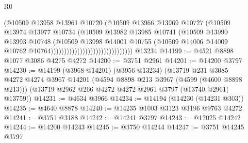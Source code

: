 \begin{lexlean}{R0}
\begin{coremodule}
                                                    (@10509
                                                      @13958
                                                      @13961
                                                      @10720
                                                      (@10509
                                                        @13966
                                                        @13969
                                                        @10727
                                                        (@10509
                                                          @13974
                                                          @13977
                                                          @10734
                                                          (@10509
                                                            @13982
                                                            @13985
                                                            @10741
                                                            (@10509
                                                              @13990
                                                              @13993
                                                              @10748
                                                              (@10509
                                                                @13998
                                                                @14001
                                                                @10755
                                                                (@10509
                                                                  @14006
                                                                  @14009
                                                                  @10762
                                                                  @10764)))))))))))))))))))))))))))))))
    @13234
@14199 := @4521 @8898 @1077 @3086 @4275 @4272
@14200 := @3751 @2961
@14201 := @14200 @3797
@14230 := @14199
    (@3968 @14201)
    (@3956 @13234)
    (@13719
      @231
      @3085
      @4272
      @4274
      @3967
      @14201
      (@4594 @8898 @213 @3967 (@4599 (@4600 @8898 @213)))
      (@13719 @2962 @266 @4272 @4272 @2961 @3797 (@13740 @2961) @13759))
@14231 := @4634 @3966
@14234 := @14194 (@14230 (@14231 @303))
@14235 := @4640 @8878
@14240 := @14235 @1003 @3123 @3196 @9763 @4272
@14241 := @3751 @3188
@14242 := @14241 @3797
@14243 := @12025 @14242
@14244 := @14200 @14243
@14245 := @3750 @14244
@14247 := @3751 @14245 @3797

\end{coremodule}
\end{lexlean}

